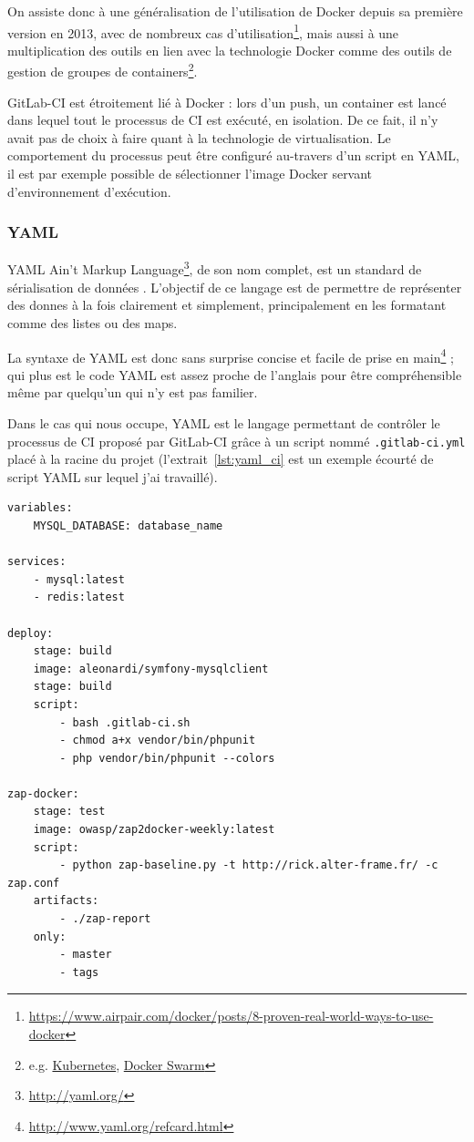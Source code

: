 On assiste donc à une généralisation de l'utilisation de Docker depuis sa première version en 2013, avec de nombreux cas d'utilisation\footnote{\url{https://www.airpair.com/docker/posts/8-proven-real-world-ways-to-use-docker}}, mais aussi à une multiplication des outils en lien avec la technologie Docker comme des outils de gestion de groupes de containers\footnote{e.g. \href{https://kubernetes.io/}{Kubernetes}, \href{https://docs.docker.com/engine/swarm/}{Docker Swarm}}.

GitLab-CI est étroitement lié à Docker : lors d'un push, un container est lancé dans lequel tout le processus de CI est exécuté, en isolation. De ce fait, il n'y avait pas de choix à faire quant à la technologie de virtualisation. Le comportement du processus peut être configuré au-travers d'un script en YAML, il est par exemple possible de sélectionner l'image Docker servant d'environnement d'exécution.

\subsubsection{YAML}
YAML Ain't Markup Language\footnote{\url{http://yaml.org/}}, de son nom complet, est un \og standard de sérialisation de données \fg. L'objectif de ce langage est de permettre de représenter des donnes à la fois clairement et simplement, principalement en les formatant comme des listes ou des maps.

La syntaxe de YAML est donc sans surprise concise et facile de prise en main\footnote{\url{http://www.yaml.org/refcard.html}} ; qui plus est le code YAML est assez proche de l'anglais pour être compréhensible même par quelqu'un qui n'y est pas familier.

Dans le cas qui nous occupe, YAML est le langage permettant de contrôler le processus de CI proposé par GitLab-CI grâce à un script nommé \verb|.gitlab-ci.yml| placé à la racine du projet (l'extrait~\ref{lst:yaml_ci} est un exemple écourté de script YAML sur lequel j'ai travaillé).

\begin{minipage}{\linewidth}
	\begin{lstlisting}[caption={Script de contrôle de processus de CI en YAML},label={lst:yaml_ci}]
variables:
    MYSQL_DATABASE: database_name

services:
    - mysql:latest
    - redis:latest

deploy:
    stage: build
    image: aleonardi/symfony-mysqlclient
    stage: build
    script:
        - bash .gitlab-ci.sh
        - chmod a+x vendor/bin/phpunit
        - php vendor/bin/phpunit --colors

zap-docker:
    stage: test
    image: owasp/zap2docker-weekly:latest
    script:
        - python zap-baseline.py -t http://rick.alter-frame.fr/ -c zap.conf
    artifacts:
        - ./zap-report
    only:
        - master
        - tags
    \end{lstlisting}
\end{minipage}

